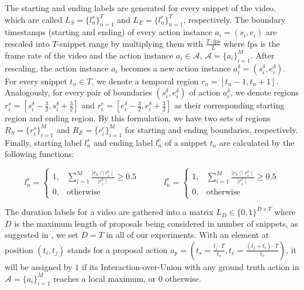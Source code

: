 \documentclass[sn-mathphys]{sn-jnl}
\theoremstyle{thmstyleone}\newtheorem{theorem}{Theorem}\newtheorem{proposition}[theorem]{Proposition}
\theoremstyle{thmstyletwo}\newtheorem{example}{Example}\newtheorem{remark}{Remark}
\theoremstyle{thmstylethree}\newtheorem{definition}{Definition}
\begin{document}
The starting and ending labels are generated for every snippet of the video, which are called $L_S=\{l^s_n\}_{n=1}^T$ and $L_E=\{l^e_n\}_{n=1}^T$, respectively. The boundary timestamps (starting and ending) of every action instance $a_i=(s_i, e_i)$ are rescaled into $T$-snippet range by multiplying them with $\frac{T \cdot \text{fps}}{L}$ where $\text{fps}$ is the frame rate of the video and the action instance $a_i \in \mathcal{A}$,  $\mathcal{A}=\{a_i\}_{i=1}^{M}$. After rescaling, the action instance $a_i$ becomes a new action instance $a^\delta_i=(s_i^\delta, e_i^\delta)$. For every snippet $t_n \in T$, we denote a temporal region $r_{n}=[t_n-1,t_n+1]$. Analogously, for every pair of boundaries $(s_i^\delta, e_i^\delta)$ of action $a_i^\delta$, we denote regions $r^s_i=[s_i^\delta-\frac{3}{2}, s_i^\delta+\frac{3}{2}]$ and $r^e_i=[e_i^\delta-\frac{3}{2}, e_i^\delta+\frac{3}{2}]$ as their corresponding starting region and ending region. By this formulation, we have two sets of regions $R_S=\{r^s_i\}^M_{i=1}$ and $R_E=\{r^e_i\}^M_{i=1}$ for starting and ending boundaries, respectively. Finally, starting label $l^s_n$ and ending label $l^e_n$ of a snippet $t_n$ are calculated by the following functions:

\begin{multicols}{2}
\centering
\begin{equation}
\nonumber
l^{\text{s}}_{n} = 
\begin{cases}
1,& \sum\limits^{M}_{i=1} \frac{\mid r_{n} \cap r_i^{\text{s}} \mid }{\mid r_i^{\text{s}} \mid} \geq 0.5
\\
0,              & \text{otherwise}
\end{cases}
\quad\quad\quad
    l^{\text{e}}_{n} = 
\begin{cases}
    1,&  \sum\limits^{M}_{i=1} \frac{ \mid r_{n} \cap r_i^{\text{e}} \mid }{ \mid r_i^{\text{e}} \mid } \geq 0.5 \\
    0, & \text{otherwise}
\end{cases}
\end{equation}
\end{multicols}

The duration labels for a video are gathered into a matrix $L_D \in \{0, 1\}^{D \times T}$ where $D$ is the maximum length of proposals being considered in number of snippets, as suggested in \cite{bmn}, we set $D=T$ in all of our experiments. With an element at position $(t_i, t_j)$ stands for a proposal action $a_p=(t_s=\frac{t_j\cdot T}{t_v}, t_e=\frac{(t_j+t_i)\cdot T}{t_v})$, it will be assigned by $1$ if its Interaction-over-Union with any ground truth action in $\mathcal{A}=\{a_i\}_{i=1}^{M}$ reaches a local maximum, or $0$ otherwise.
\end{document}
